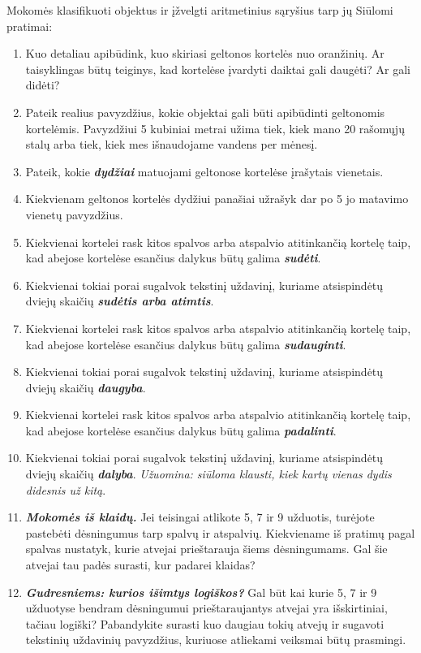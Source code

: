 \documentclass{article}
\begin{document}
\begin{mybox}{Mokomės klasifikuoti objektus ir įžvelgti aritmetinius sąryšius tarp jų}
Siūlomi pratimai:
\begin{enumerate}
\item Kuo detaliau apibūdink, kuo skiriasi geltonos kortelės nuo oranžinių. Ar taisyklingas būtų teiginys, kad kortelėse įvardyti daiktai gali daugėti? Ar gali didėti?
\item Pateik realius pavyzdžius, kokie objektai gali būti apibūdinti geltonomis kortelėmis. Pavyzdžiui 5 kubiniai metrai užima tiek, kiek mano 20 rašomųjų stalų arba tiek, kiek mes išnaudojame vandens per mėnesį.
\item Pateik, kokie \textbf{\textit{dydžiai}} matuojami geltonose kortelėse įrašytais vienetais.
\item Kiekvienam geltonos kortelės dydžiui panašiai užrašyk dar po 5 jo matavimo vienetų pavyzdžius.
\item Kiekvienai kortelei rask kitos spalvos arba atspalvio atitinkančią kortelę taip, kad abejose kortelėse esančius dalykus būtų galima \textbf{\textit{sudėti}}.
\item Kiekvienai tokiai porai sugalvok tekstinį uždavinį, kuriame atsispindėtų dviejų skaičių \textbf{\textit{sudėtis arba atimtis}}.
\item Kiekvienai kortelei rask kitos spalvos arba atspalvio atitinkančią kortelę taip, kad abejose kortelėse esančius dalykus būtų galima \textbf{\textit{sudauginti}}.
\item Kiekvienai tokiai porai sugalvok tekstinį uždavinį, kuriame atsispindėtų dviejų skaičių \textbf{\textit{daugyba}}.
\item Kiekvienai kortelei rask kitos spalvos arba atspalvio atitinkančią kortelę taip, kad abejose kortelėse esančius dalykus būtų galima \textbf{\textit{padalinti}}.
\item Kiekvienai tokiai porai sugalvok tekstinį uždavinį, kuriame atsispindėtų dviejų skaičių \textbf{\textit{dalyba}}. \textit{Užuomina:  siūloma klausti, kiek kartų vienas dydis didesnis už kitą}.
\item \textbf{\textit{Mokomės iš klaidų.}} Jei teisingai atlikote 5, 7 ir 9 užduotis, turėjote pastebėti dėsningumus tarp spalvų ir atspalvių. Kiekviename iš pratimų pagal spalvas nustatyk, kurie atvejai prieštarauja šiems dėsningumams. Gal šie atvejai tau padės surasti, kur padarei klaidas?
\item \textbf{\textit{Gudresniems: kurios išimtys logiškos?}} Gal būt kai kurie 5, 7 ir 9 užduotyse bendram dėsningumui prieštaraujantys atvejai yra išskirtiniai, tačiau logiški? Pabandykite surasti kuo daugiau tokių atvejų ir sugavoti tekstinių uždavinių pavyzdžius, kuriuose atliekami veiksmai būtų prasmingi.
\end{enumerate}
\end{mybox}
\end{document}
